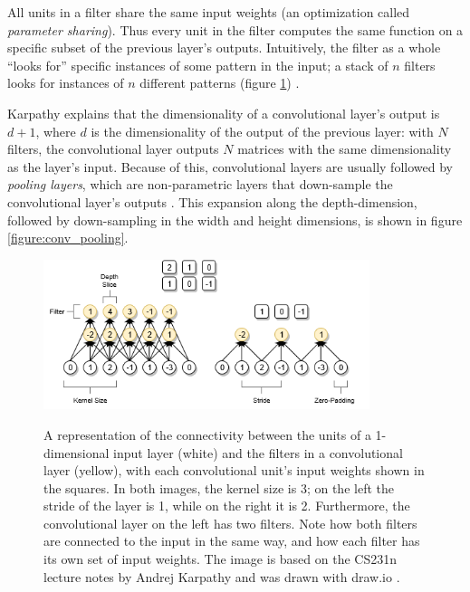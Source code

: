 \documentclass[12pt, titlepage]{report}
\theoremstyle{definition}
\begin{document}
All units in a filter share the same input weights (an optimization called \emph{parameter sharing}). Thus every unit in the filter computes the same function on a specific subset of the previous layer's outputs. Intuitively, the filter as a whole ``looks for'' specific instances of some pattern in the input; a stack of $n$ filters looks for instances of $n$ different patterns (figure \ref{figure:convolution1d}) \cite[Convolutional Neural Networks: Architectures, Convolution / Pooling Layers]{karpathy2017cs231n}.

Karpathy explains that the dimensionality of a convolutional layer's output is $d + 1$, where $d$ is the dimensionality of the output of the previous layer: with $N$ filters, the convolutional layer outputs $N$ matrices with the same dimensionality as the layer's input. Because of this, convolutional layers are usually followed by \emph{pooling layers}, which are non-parametric layers that down-sample the convolutional layer's outputs \cite[Convolutional Neural Networks: Architectures, Convolution / Pooling Layers]{karpathy2017cs231n}. This expansion along the depth-dimension, followed by down-sampling in the width and height dimensions, is shown in figure \ref{figure:conv_pooling}.

\begin{figure}
    \centering
    \includegraphics[width=0.85\textwidth]{img/convolution.png}\\
    \caption{A representation of the connectivity between the units of a 1-dimensional input layer (white) and the filters in a convolutional layer (yellow), with each convolutional unit's input weights shown in the squares. In both images, the kernel size is 3; on the left the stride of the layer is 1, while on the right it is 2. Furthermore, the convolutional layer on the left has two filters. Note how both filters are connected to the input in the same way, and how each filter has its own set of input weights. The image is based on the CS231n lecture notes by Andrej Karpathy \cite[Convolutional Neural Networks: Architectures, Convolution / Pooling Layers]{karpathy2017cs231n} and was drawn with draw.io \cite{jgraph2018draw}.}
    \label{figure:convolution1d}
\end{figure}
\end{document}
